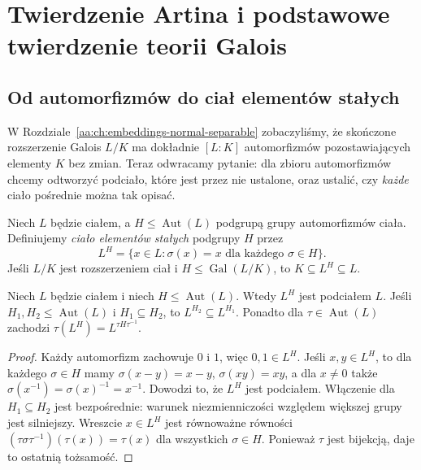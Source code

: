 \chapter[Twierdzenie Artina i odpowiedniość Galois]{Twierdzenie Artina i podstawowe twierdzenie teorii Galois}
\label{aa:ch:galois-correspondence}

\section{Od automorfizmów do ciał elementów stałych}
W Rozdziale~\ref{aa:ch:embeddings-normal-separable} zobaczyliśmy,
że skończone rozszerzenie Galois $L/K$ ma dokładnie
$[L:K]$ automorfizmów pozostawiających elementy $K$ bez zmian.
Teraz odwracamy pytanie: dla zbioru automorfizmów chcemy
odtworzyć podciało, które jest przez nie ustalone, oraz
ustalić, czy \emph{każde} ciało pośrednie można tak opisać.

\begin{definicja}
\label{aa:def:fixed-field}
Niech $L$ będzie ciałem, a $H\le\operatorname{Aut}(L)$
podgrupą grupy automorfizmów ciała. Definiujemy
\emph{ciało elementów stałych} podgrupy $H$ przez
\[
L^H=\{x\in L:\sigma(x)=x\text{ dla każdego }\sigma\in H\}.
\]
Jeśli $L/K$ jest rozszerzeniem ciał i
$H\le\operatorname{Gal}(L/K)$, to $K\subseteq L^H\subseteq L$.
\end{definicja}

\begin{lemat}
\label{aa:lem:fixed-field}
Niech $L$ będzie ciałem i niech $H\le\operatorname{Aut}(L)$. Wtedy $L^H$ jest
podciałem $L$. Jeśli $H_1,H_2\le\operatorname{Aut}(L)$ i
$H_1\subseteq H_2$, to $L^{H_2}\subseteq L^{H_1}$.
Ponadto dla
$\tau\in\operatorname{Aut}(L)$ zachodzi
$\tau(L^H)=L^{\tau H\tau^{-1}}$.
\end{lemat}
\begin{proof}
Każdy automorfizm zachowuje $0$ i $1$, więc $0,1\in L^H$.
Jeśli $x,y\in L^H$, to dla każdego $\sigma\in H$ mamy
$\sigma(x-y)=x-y$, $\sigma(xy)=xy$, a dla $x\ne0$
także $\sigma(x^{-1})=\sigma(x)^{-1}=x^{-1}$.
Dowodzi to, że $L^H$ jest podciałem. Włączenie dla
$H_1\subseteq H_2$ jest bezpośrednie: warunek
niezmienniczości względem większej grupy jest silniejszy.
Wreszcie $x\in L^H$ jest równoważne równości
$(\tau\sigma\tau^{-1})(\tau(x))=\tau(x)$ dla
wszystkich $\sigma\in H$. Ponieważ $\tau$ jest bijekcją,
daje to ostatnią tożsamość.
\end{proof}

